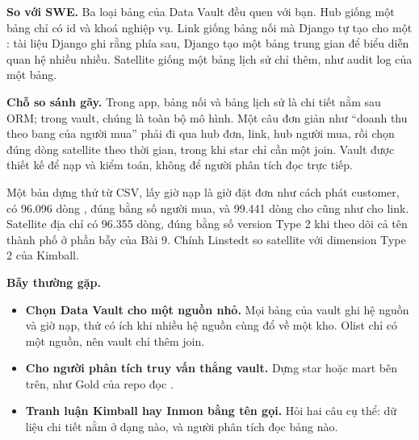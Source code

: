\begin{ghichu}
\textbf{So với SWE.} Ba loại bảng của Data Vault đều quen với bạn. Hub giống một bảng chỉ có id và khoá nghiệp vụ. Link giống bảng nối mà Django tự tạo cho một : tài liệu Django ghi rằng phía sau, Django tạo một bảng trung gian để biểu diễn quan hệ nhiều nhiều. Satellite giống một bảng lịch sử chỉ thêm, như audit log của một bảng.

\textbf{Chỗ so sánh gãy.} Trong app, bảng nối và bảng lịch sử là chi tiết nằm sau ORM; trong vault, chúng là toàn bộ mô hình. Một câu đơn giản như ``doanh thu theo bang của người mua'' phải đi qua hub đơn, link, hub người mua, rồi chọn đúng dòng satellite theo thời gian, trong khi star chỉ cần một join. Vault được thiết kế để nạp và kiểm toán, không để người phân tích đọc trực tiếp.
\end{ghichu}

Một bản dựng thử từ CSV, lấy giờ nạp là giờ đặt đơn như cách  phát customer, có 96.096 dòng , đúng bằng số người mua, và 99.441 dòng cho  cũng như cho link. Satellite địa chỉ có 96.355 dòng, đúng bằng số version Type 2 khi theo dõi cả tên thành phố ở phần bẫy của Bài 9. Chính Linstedt so satellite với dimension Type 2 của Kimball.

\begin{luuy}
\textbf{Bẫy thường gặp.}
\begin{itemize}
  \item \textbf{Chọn Data Vault cho một nguồn nhỏ.} Mọi bảng của vault ghi hệ nguồn và giờ nạp, thứ có ích khi nhiều hệ nguồn cùng đổ về một kho. Olist chỉ có một nguồn, nên vault chỉ thêm join.
  \item \textbf{Cho người phân tích truy vấn thẳng vault.} Dựng star hoặc mart bên trên, như Gold của repo đọc .
  \item \textbf{Tranh luận Kimball hay Inmon bằng tên gọi.} Hỏi hai câu cụ thể: dữ liệu chi tiết nằm ở dạng nào, và người phân tích đọc bảng nào.
\end{itemize}
\end{luuy}

